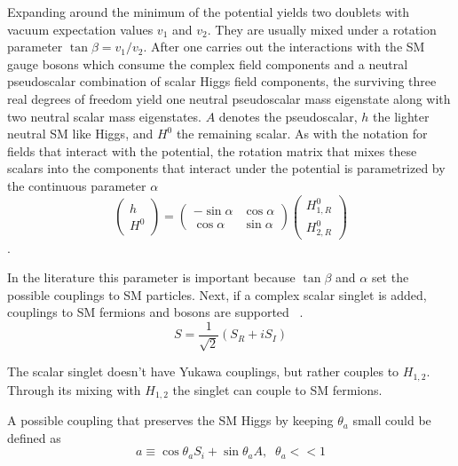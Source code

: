 Expanding around the minimum of the potential yields two doublets with vacuum expectation values $v_1$ and $v_2$. They are usually mixed under a rotation parameter $\tan \beta = v_1 / v_2$. After one carries out the interactions with the SM gauge bosons which consume the complex field components and a neutral pseudoscalar combination of scalar Higgs field components, the surviving three real degrees of freedom yield one neutral pseudoscalar mass eigenstate along with two neutral scalar mass eigenstates. $A$ denotes the pseudoscalar, $h$ the lighter neutral SM like Higgs, and $H^0$ the remaining scalar. As with the notation for fields that interact with the potential, the rotation matrix that mixes these scalars into the components that interact under the potential is parametrized by the continuous parameter $\alpha$ 
\begin{equation}
\begin{pmatrix} h \\ H^0\end{pmatrix} = \begin{pmatrix} -\sin\alpha & \cos\alpha \\ \cos\alpha & \sin\alpha \end{pmatrix}   \begin{pmatrix}H^0_{1,R} \\ H^0_{2,R}\end{pmatrix} 
\end{equation}.


In the literature this parameter is important because $\tan \beta$ and $\alpha$ set the possible couplings to SM particles. Next, if a complex scalar singlet is added, couplings to SM fermions and bosons are supported ~\cite{Curtin_2014}.
\begin{equation}S = \frac{1}{\sqrt{2}}(S_R + iS_I)\end{equation}

The scalar singlet doesn't have Yukawa couplings, but rather couples to $H_{1,2}$. Through its mixing with $H_{1,2}$ the singlet can couple to SM fermions. 

A possible coupling that preserves the SM Higgs by keeping $\theta_a$ small could be defined as  
\begin{equation}a \equiv \cos \theta_a S_i + \sin \theta_a A ,\;\; \theta_a << 1 \end{equation}

